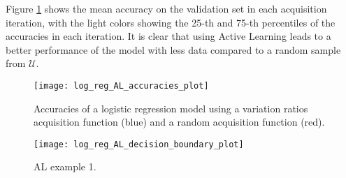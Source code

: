 Figure \ref{fig:log_reg_AL_accuracies_plot} shows the mean accuracy on the validation set in each acquisition iteration, with the light colors showing the 25-th and 75-th percentiles of the accuracies in each iteration. It is clear that using Active Learning leads to a better performance of the model with less data compared to a random sample from $\mathcal{U}$.

\begin{figure}[H]
    \centering
    \texttt{[image: log\_reg\_AL\_accuracies\_plot]}
    \caption{Accuracies of a logistic regression model using a variation ratios acquisition function (blue) and a random acquisition function (red).}
    \label{fig:log_reg_AL_accuracies_plot}
\end{figure}


\begin{figure}[H]
    \centering
    \texttt{[image: log\_reg\_AL\_decision\_boundary\_plot]}
    \caption{AL example 1.}
    \label{fig:log_reg_AL_decision_boundary_plot}
\end{figure}
